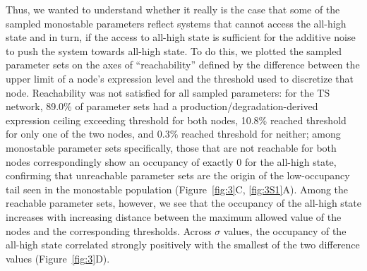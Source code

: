\documentclass[11pt]{article}
\providecommand{\DIFaddtex}[1]{{\protect\color{red}#1}} %
\providecommand{\DIFdeltex}[1]{} %
\providecommand{\DIFaddbegin}{} %
\providecommand{\DIFaddend}{} %
\providecommand{\DIFdelbegin}{} %
\providecommand{\DIFdelend}{} %
\providecommand{\DIFadd}[1]{\texorpdfstring{\DIFaddtex{#1}}{#1}} %
\providecommand{\DIFdel}[1]{\texorpdfstring{\DIFdeltex{#1}}{}} %
\providecommand{\DIFaddincludegraphics}[2][]{\DIFOincludegraphics[#1]{#2}} %
\providecommand{\DIFdelincludegraphics}[2][]{}
\DeclareRobustCommand{\DIFaddbegin}{\DIFOaddbegin \let\includegraphics\DIFaddincludegraphics} %
\DeclareRobustCommand{\DIFaddend}{\DIFOaddend \let\includegraphics\DIFOincludegraphics} %
\DeclareRobustCommand{\DIFdelbegin}{\DIFOdelbegin \let\includegraphics\DIFdelincludegraphics} %
\DeclareRobustCommand{\DIFdelend}{\DIFOaddend \let\includegraphics\DIFOincludegraphics} %
\begin{document}
Thus, we wanted to understand whether it really is the case that some of the sampled monostable parameters reflect systems that cannot access the all-high state and in turn, if the access to all-high state is sufficient for the additive noise to push the system towards all-high state. To do this, we plotted the sampled parameter sets on the axes of ``reachability'' defined by the difference between the upper limit of a node's expression level and the threshold used to discretize that node. Reachability was not satisfied for all sampled parameters: for the TS network, 89.0\% of parameter sets had a production/degradation-derived expression ceiling exceeding threshold for both nodes, 10.8\% reached threshold for only one of the two nodes, and 0.3\% reached threshold for neither; among monostable parameter sets specifically, those that are not reachable for both nodes correspondingly show an \DIFdelbegin \DIFdel{MRT }\DIFdelend \DIFaddbegin \DIFadd{occupancy }\DIFaddend of exactly 0 for the all-high state, confirming that unreachable parameter sets are the origin of the \DIFdelbegin \DIFdel{low-MRT }\DIFdelend \DIFaddbegin \DIFadd{low-occupancy }\DIFaddend tail seen in the monostable population (Figure~\ref{fig:3}C, \ref{fig:3S1}A). Among the reachable parameter sets, however, we see that the \DIFdelbegin \DIFdel{MRT }\DIFdelend \DIFaddbegin \DIFadd{occupancy }\DIFaddend of the all-high state increases with increasing distance between the maximum allowed value of the nodes and the corresponding thresholds. Across $\sigma$ values, the \DIFdelbegin \DIFdel{MRT }\DIFdelend \DIFaddbegin \DIFadd{occupancy }\DIFaddend of the all-high state correlated strongly positively with the smallest of the two difference values (Figure~\ref{fig:3}D).
\end{document}
